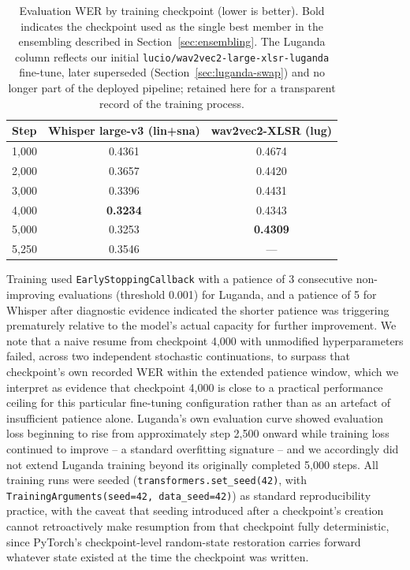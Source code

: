 \documentclass[11pt]{article}
\begin{document}
\begin{table}[htbp]
\centering
\caption{Evaluation WER by training checkpoint (lower is better). Bold indicates the checkpoint used as the single best member in the ensembling described in Section~\ref{sec:ensembling}. The Luganda column reflects our initial \texttt{lucio/wav2vec2-\allowbreak large-\allowbreak xlsr-\allowbreak luganda} fine-tune, later superseded (Section~\ref{sec:luganda-swap}) and no longer part of the deployed pipeline; retained here for a transparent record of the training process.}
\label{tab:checkpoints}
\begin{tabular}{lcc}
\toprule
Step & Whisper large-v3 (lin+sna) & wav2vec2-XLSR (lug) \\
\midrule
1{,}000 & 0.4361 & 0.4674 \\
2{,}000 & 0.3657 & 0.4420 \\
3{,}000 & 0.3396 & 0.4431 \\
4{,}000 & \textbf{0.3234} & 0.4343 \\
5{,}000 & 0.3253 & \textbf{0.4309} \\
5{,}250 & 0.3546 & --- \\
\bottomrule
\end{tabular}
\end{table}

Training used \texttt{EarlyStoppingCallback} with a patience of 3 consecutive non-improving evaluations (threshold 0.001) for Luganda, and a patience of 5 for Whisper after diagnostic evidence indicated the shorter patience was triggering prematurely relative to the model's actual capacity for further improvement. We note that a naive resume from checkpoint 4{,}000 with unmodified hyperparameters failed, across two independent stochastic continuations, to surpass that checkpoint's own recorded WER within the extended patience window, which we interpret as evidence that checkpoint 4{,}000 is close to a practical performance ceiling for this particular fine-tuning configuration rather than as an artefact of insufficient patience alone. Luganda's own evaluation curve showed evaluation loss beginning to rise from approximately step 2{,}500 onward while training loss continued to improve -- a standard overfitting signature -- and we accordingly did not extend Luganda training beyond its originally completed 5{,}000 steps. All training runs were seeded (\texttt{transformers.set\_seed(42)}, with \texttt{TrainingArguments(seed=42, data\_seed=42)}) as standard reproducibility practice, with the caveat that seeding introduced after a checkpoint's creation cannot retroactively make resumption from that checkpoint fully deterministic, since PyTorch's checkpoint-level random-state restoration carries forward whatever state existed at the time the checkpoint was written.
\end{document}
